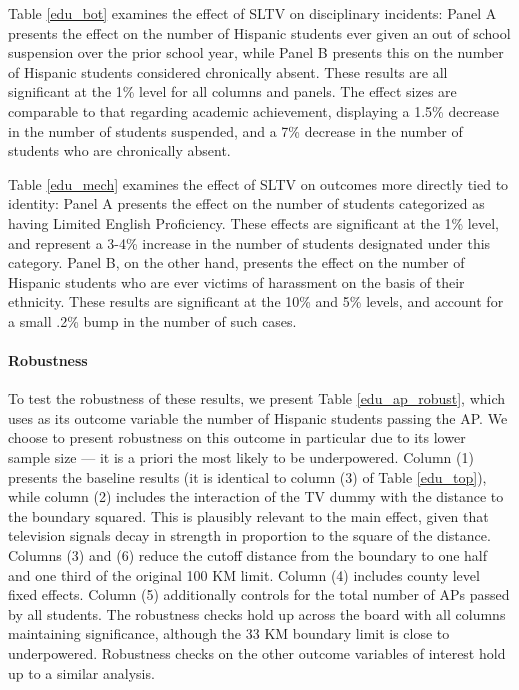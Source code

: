 \documentclass[11pt]{article}
\begin{document}
Table \ref{edu_bot} examines the effect of SLTV on disciplinary incidents: Panel A presents the effect on the number of Hispanic students ever given an out of school suspension over the prior school year, while Panel B presents this on the number of Hispanic students considered chronically absent. These results are all significant at the 1\% level for all columns and panels. The effect sizes are comparable to that regarding academic achievement, displaying a 1.5\% decrease in the number of students suspended, and a 7\% decrease in the number of students who are chronically absent.

Table \ref{edu_mech} examines the effect of SLTV on outcomes more directly tied to identity: Panel A presents the effect on the number of students categorized as having Limited English Proficiency. These effects are significant at the 1\% level, and represent a 3-4\% increase in the number of students designated under this category. Panel B, on the other hand, presents the effect on the number of Hispanic students who are ever victims of harassment on the basis of their ethnicity. These results are significant at the 10\% and 5\% levels, and account for a small .2\% bump in the number of such cases. 

\paragraph{Robustness} To test the robustness of these results, we present Table \ref{edu_ap_robust}, which uses as its outcome variable the number of Hispanic students passing the AP. We choose to present robustness on this outcome in particular due to its lower sample size --- it is a priori the most likely to be underpowered. Column (1) presents the baseline results (it is identical to column (3) of Table \ref{edu_top}), while column (2) includes the interaction of the TV dummy with the distance to the boundary squared. This is plausibly relevant to the main effect, given that television signals decay in strength in proportion to the square of the distance. Columns (3) and (6) reduce the cutoff distance from the boundary to one half and one third of the original 100 KM limit. Column (4) includes county level fixed effects. Column (5) additionally controls for the total number of APs passed by all students. The robustness checks hold up across the board with all columns maintaining significance, although the 33 KM boundary limit is close to underpowered. Robustness checks on the other outcome variables of interest hold up to a similar analysis.
\end{document}
